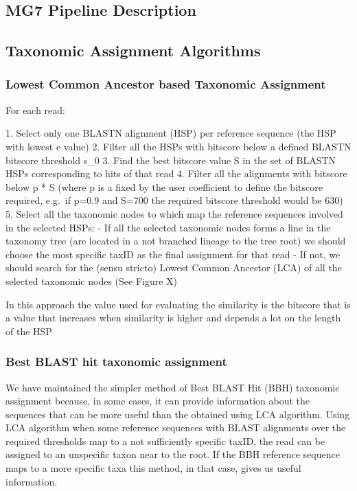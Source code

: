 \documentclass{frontiersSCNS} %
\begin{document}
\subsection{MG7 Pipeline Description}\label{mg7-pipeline-description}

\subsection{Taxonomic Assignment
Algorithms}\label{taxonomic-assignment-algorithms}

\subsubsection{Lowest Common Ancestor based Taxonomic
Assignment}\label{lowest-common-ancestor-based-taxonomic-assignment}

For each read:

­1. Select only one BLASTN alignment (HSP) per reference sequence (the
HSP with lowest e value) 2. Filter all the HSPs with bitscore below a
defined BLASTN bitscore threshold s\_0 3. Find the best bitscore value S
in the set of BLASTN HSPs corresponding to hits of that read 4. Filter
all the alignments with bitscore below p * S (where p is a fixed by the
user coefficient to define the bitscore required, e.g.~if p=0.9 and
S=700 the required bitscore threshold would be 630) 5. Select all the
taxonomic nodes to which map the reference sequences involved in the
selected HSPs: - If all the selected taxonomic nodes forms a line in the
taxonomy tree (are located in a not branched lineage to the tree root)
we should choose the most specific taxID as the final assignment for
that read - If not, we should search for the (sensu stricto) Lowest
Common Ancestor (LCA) of all the selected taxonomic nodes (See Figure X)

In this approach the value used for evaluating the similarity is the
bitscore that is a value that increases when similarity is higher and
depends a lot on the length of the HSP

\subsubsection{Best BLAST hit taxonomic
assignment}\label{best-blast-hit-taxonomic-assignment}

We have maintained the simpler method of Best BLAST Hit (BBH) taxonomic
assignment because, in some cases, it can provide information about the
sequences that can be more useful than the obtained using LCA algorithm.
Using LCA algorithm when some reference sequences with BLAST alignments
over the required thresholds map to a not sufficiently specific taxID,
the read can be assigned to an unspecific taxon near to the root. If the
BBH reference sequence maps to a more specific taxa this method, in that
case, gives us useful information.
\end{document}
